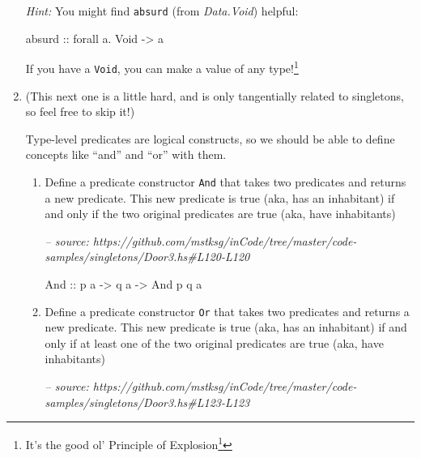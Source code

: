 \documentclass[]{article}
\newenvironment{Shaded}{}{}
\newcommand{\CommentTok}[1]{\textcolor[rgb]{0.38,0.63,0.69}{\textit{#1}}}
\newcommand{\DataTypeTok}[1]{\textcolor[rgb]{0.56,0.13,0.00}{#1}}
\newcommand{\FunctionTok}[1]{\textcolor[rgb]{0.02,0.16,0.49}{#1}}
\newcommand{\NormalTok}[1]{#1}
\newcommand{\OtherTok}[1]{\textcolor[rgb]{0.00,0.44,0.13}{#1}}
\renewcommand{\href}[2]{#2\footnote{\url{#1}}}
\begin{document}
\begin{enumerate}
  \emph{Hint:} You might find \texttt{absurd} (from \emph{Data.Void}) helpful:

\begin{Shaded}
\begin{Highlighting}[]
\OtherTok{absurd ::}\NormalTok{ forall a}\FunctionTok{.} \DataTypeTok{Void} \OtherTok{->}\NormalTok{ a}
\end{Highlighting}
\end{Shaded}

  If you have a \texttt{Void}, you can make a value of any type!\footnote{It's
    the good ol'
    \href{https://en.wikipedia.org/wiki/Principle_of_explosion}{Principle of
    Explosion}}
\item
  (This next one is a little hard, and is only tangentially related to
  singletons, so feel free to skip it!)

  Type-level predicates are logical constructs, so we should be able to define
  concepts like ``and'' and ``or'' with them.

  \begin{enumerate}
  \def\labelenumii{\alph{enumii}.}
  \item
    Define a predicate constructor \texttt{And} that takes two predicates and
    returns a new predicate. This new predicate is true (aka, has an inhabitant)
    if and only if the two original predicates are true (aka, have inhabitants)

\begin{Shaded}
\begin{Highlighting}[]
\CommentTok{-- source: https://github.com/mstksg/inCode/tree/master/code-samples/singletons/Door3.hs#L120-L120}

    \DataTypeTok{And}\OtherTok{ ::}\NormalTok{ p a }\OtherTok{->}\NormalTok{ q a }\OtherTok{->} \DataTypeTok{And}\NormalTok{ p q a}
\end{Highlighting}
\end{Shaded}
  \item
    Define a predicate constructor \texttt{Or} that takes two predicates and
    returns a new predicate. This new predicate is true (aka, has an inhabitant)
    if and only if at least one of the two original predicates are true (aka,
    have inhabitants)

\begin{Shaded}
\begin{Highlighting}[]
\CommentTok{-- source: https://github.com/mstksg/inCode/tree/master/code-samples/singletons/Door3.hs#L123-L123}


\end{Highlighting}
\end{Shaded}
\end{enumerate}
\end{enumerate}
\end{document}

